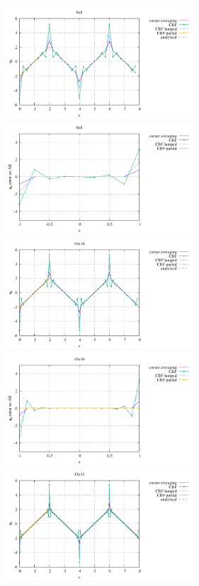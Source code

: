 \begin{center}
\includegraphics[width=7cm]{python_codes/fieldstone_173/results/exp4/heat_flux_boundary_8.pdf}
\includegraphics[width=7cm]{python_codes/fieldstone_173/results/exp4/heat_flux_boundary_bottom_8.pdf}\\
\includegraphics[width=7cm]{python_codes/fieldstone_173/results/exp4/heat_flux_boundary_16.pdf}
\includegraphics[width=7cm]{python_codes/fieldstone_173/results/exp4/heat_flux_boundary_bottom_16.pdf}\\
\includegraphics[width=7cm]{python_codes/fieldstone_173/results/exp4/heat_flux_boundary_32.pdf}

\end{center}
